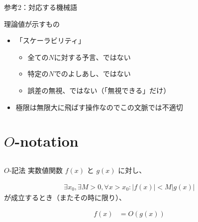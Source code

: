 \documentclass{beamer}
\begin{document}
\begin{frame}[fragile]{参考2：対応する機械語\href{https://godbolt.org}{}}{}
\end{frame}

\begin{frame}[fragile]{理論値が示すもの}{}

\begin{center}
\end{center}



\begin{itemize}\itemsep8pt
\item 「スケーラビリティ」
\begin{itemize}%
\item 全ての$N$に対する予言、ではない
\item 特定の$N$でのよしあし、ではない
\item 誤差の無視、ではない（「無視できる」だけ）
\end{itemize}
\item 極限は無限大に飛ばす操作なのでこの文脈では不適切
\end{itemize}
\end{frame}

\section{$O$-notation}		%
\subsection{}

\begin{frame}[fragile]{$O$-記法}{}
実数値関数 $f(x)$ と $g(x)$ に対し、

\begin{align*}
\exists x_{0}, \exists M > 0,  \forall x > x_{0} : |f(x)| < M | g(x) |
\end{align*}
が成立するとき（またその時に限り）、

\begin{align*}
f(x) &= O(g(x))
\end{align*}
\end{frame}
\end{document}
